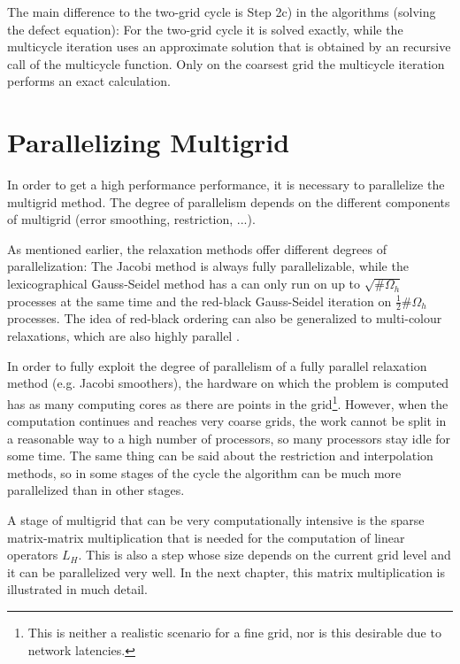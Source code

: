 The main difference to the two-grid cycle is Step 2c) in the algorithms (solving the defect equation): For the two-grid cycle it is solved exactly, while the multicycle iteration uses an approximate solution that is obtained by an recursive call of the multicycle function. Only on the coarsest grid the multicycle iteration performs an exact calculation. 



\section{Parallelizing Multigrid}
In order to get a high performance performance, it is necessary to parallelize the multigrid method. The degree of parallelism depends on the different components of multigrid (error smoothing, restriction, ...). 

As mentioned earlier, the relaxation methods offer different degrees of parallelization: The Jacobi method is always fully parallelizable, while the lexicographical Gauss-Seidel method  has a can only run on up to $\sqrt{\#\Omega_h}$ processes at the same time and the red-black Gauss-Seidel iteration on $\frac{1}{2} \#\Omega_h$ processes. The idea of red-black ordering can also be generalized to multi-colour relaxations, which are also highly parallel \cite{Trottenberg:2000:MUL:374106}.

In order to fully exploit the degree of parallelism of a fully parallel relaxation method (e.g. Jacobi smoothers), the hardware on which the problem is computed has as many computing cores as there are points in the grid\footnote{This is neither a realistic scenario for a fine grid, nor is this desirable due to network latencies.}. However, when the computation continues and reaches very coarse grids, the work cannot be split in a reasonable way to a high number of processors, so many processors stay idle for some time. The same thing can be said about the restriction and interpolation methods, so in some stages of the cycle the algorithm can be much more parallelized than in other stages.

A stage of multigrid that can be very computationally intensive is the sparse matrix-matrix multiplication that is needed for the computation of linear operators $L_H$. This is also a step whose size depends on the current grid level and it can be  parallelized very well. In the next chapter, this matrix multiplication is illustrated in much detail.



